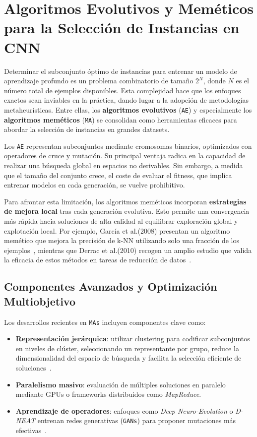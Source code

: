 \section{Algoritmos Evolutivos y Meméticos para la Selección de Instancias en CNN}

Determinar el subconjunto óptimo de instancias para entrenar un modelo de aprendizaje profundo es un problema combinatorio de tamaño $2^N$, donde $N$ es el número total de ejemplos disponibles.
Esta complejidad hace que los enfoques exactos sean inviables en la práctica, dando lugar a la adopción de metodologías metaheurísticas.
Entre ellas, los \textbf{algoritmos evolutivos} (\texttt{AE}) y especialmente los \textbf{algoritmos meméticos} (\texttt{MA})
se consolidan como herramientas eficaces para abordar la selección de instancias en grandes datasets.

Los \texttt{AE} representan subconjuntos mediante cromosomas binarios, optimizados con operadores de cruce y mutación.
Su principal ventaja radica en la capacidad de realizar una búsqueda global en espacios no derivables.
Sin embargo, a medida que el tamaño del conjunto crece, el coste de evaluar el fitness, que implica entrenar modelos en cada generación, se vuelve prohibitivo.

Para afrontar esta limitación, los algoritmos meméticos incorporan \textbf{estrategias de mejora local} tras cada generación evolutiva.
Esto permite una convergencia más rápida hacia soluciones de alta calidad al equilibrar exploración global y explotación local.
Por ejemplo, García et al.(2008) presentan un algoritmo memético que mejora la precisión de k-NN utilizando solo una fracción de los ejemplos~\cite{garciaMemeticAlgorithmEvolutionary2008},
mientras que Derrac et al.(2010) recogen un amplio estudio que valida la eficacia de estos métodos en tareas de reducción de datos~\cite{derracSurveyEvolutionaryInstance2012}.

\subsection{Componentes Avanzados y Optimización Multiobjetivo}

Los desarrollos recientes en \texttt{MAs} incluyen componentes clave como:

\begin{itemize}
      \item \textbf{Representación jerárquica}: utilizar clustering para codificar subconjuntos en niveles de clúster,
            seleccionando un representante por grupo, reduce la dimensionalidad del espacio de búsqueda y facilita la selección eficiente de soluciones~\cite{chenClusteringBasedSubsetSelection2021}.
      \item \textbf{Paralelismo masivo}: evaluación de múltiples soluciones en paralelo mediante GPUs o frameworks distribuidos como \textit{MapReduce}.
      \item \textbf{Aprendizaje de operadores}: enfoques como \textit{Deep Neuro-Evolution} o \textit{D-NEAT} entrenan redes generativas (\texttt{GANs})
            para proponer mutaciones más efectivas~\cite{realRegularizedEvolutionImage2019}.
\end{itemize}

